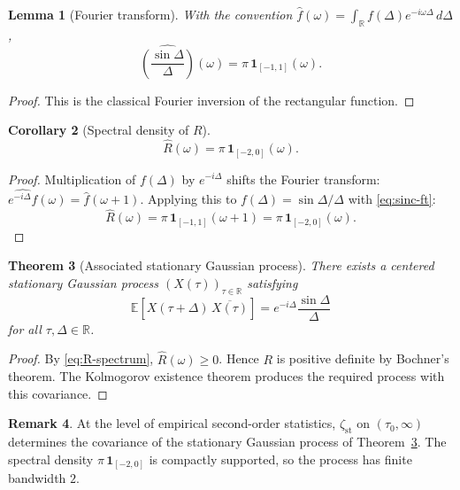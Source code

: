 \documentclass[11pt]{article}
\numberwithin{equation}{section}
\theoremstyle{plain}
\newtheorem{theorem}{Theorem}[section]
\newtheorem{lemma}[theorem]{Lemma}
\newtheorem{corollary}[theorem]{Corollary}
\theoremstyle{definition}
\newtheorem{remark}[theorem]{Remark}
\begin{document}
\begin{lemma}[Fourier transform]
With the convention \(\widehat{f}(\omega)=\int_\mathbb{R} f(\Delta)e^{-i\omega\Delta}\,d\Delta\),
\begin{equation}
\widehat{\left(\frac{\sin\Delta}{\Delta}\right)}(\omega)
=\pi\,\mathbf{1}_{[-1,1]}(\omega).
\label{eq:sinc-ft}
\end{equation}
\end{lemma}

\begin{proof}
This is the classical Fourier inversion of the rectangular function.
\end{proof}

\begin{corollary}[Spectral density of \(R\)]
\begin{equation}
\widehat{R}(\omega)=\pi\,\mathbf{1}_{[-2,0]}(\omega).
\label{eq:R-spectrum}
\end{equation}
\end{corollary}

\begin{proof}
Multiplication of \(f(\Delta)\) by \(e^{-i\Delta}\) shifts the Fourier transform:
\(\widehat{e^{-i\Delta}f}(\omega)=\widehat{f}(\omega+1)\). Applying this to
\(f(\Delta)=\sin\Delta/\Delta\) with \eqref{eq:sinc-ft}:
\[
\widehat{R}(\omega)=\pi\,\mathbf{1}_{[-1,1]}(\omega+1)=\pi\,\mathbf{1}_{[-2,0]}(\omega).
\]
\end{proof}

\begin{theorem}[Associated stationary Gaussian process]
\label{thm:gaussian}
There exists a centered stationary Gaussian process \((X(\tau))_{\tau\in\mathbb{R}}\)
satisfying
\[
\mathbb{E}\!\left[X(\tau+\Delta)\,\overline{X(\tau)}\right]
=e^{-i\Delta}\frac{\sin\Delta}{\Delta}
\]
for all \(\tau,\Delta\in\mathbb{R}\).
\end{theorem}

\begin{proof}
By \eqref{eq:R-spectrum}, \(\widehat{R}(\omega)\ge0\). Hence \(R\) is positive definite
by Bochner's theorem. The Kolmogorov existence theorem produces the required process
with this covariance.
\end{proof}

\begin{remark}
At the level of empirical second-order statistics, \(\zeta_{\mathrm{st}}\) on
\((\tau_0,\infty)\) determines the covariance of the stationary Gaussian process
of Theorem~\ref{thm:gaussian}. The spectral density \(\pi\,\mathbf{1}_{[-2,0]}\) is
compactly supported, so the process has finite bandwidth \(2\).
\end{remark}
\end{document}
